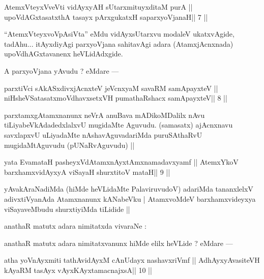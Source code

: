 \begin{shl}
AtemxVteyxVveVti vidAyxyAH sUtarxmituyxditaM purA ||
upoVdAGxtasatxthA tasayx pArxgukatxH saparxyoVjanaH\hfill || 7 ||
\end{shl}

\begin{artha}
``AtemxVteyxvoVpAsiVta'' eMdu vidAyxsUtarxvu modaleV ukatxvAgide, tadAhu... itAyxdiyAgi parxyoVjana sahitavAgi adara (AtamxjAcnxnada) upoVdhAGxtavanenx heVLidAdxgide.
\end{artha} 
 
\begin{artha}
A parxyoVjana yAvudu ? eMdare ---
\end{artha}

\begin{shl}
parxtiVci sAkASxdivxjAcnxteV jeVcnxyaM savaRM samApayxteV ||
niHsheVSatasatxmoVdhavxsetxVH pumathaRshacx samApayxteV\hfill || 8 ||
\end{shl}

\begin{artha}
parxtamxgAtamxnanunx neVrA anuBava mADikoMDalilx nAvu tiLiyabeVkAdadedxlalxvU mugidaMte Aguvudu. (samasatx) ajAcnxnavu savxlapxvU uLiyadaMte nAshavAguvadariMda puruSAthaRvU mugidaMtAguvudu (pUNaRvAguvudu) ||
\end{artha}

\begin{shl}
yata EvamataH pasheyxVdAtamxnAyxtAmxnamadavxyamf ||
AtemxYkoV barxhamxvidAyxyA viSayaH shurxtitoV mataH\hfill || 9 ||
\end{shl}

\begin{artha}
yAvakAraNadiMda (hiMde heVLidaMte PalaviruvudoV) adariMda tananxlelxV adivxtiVyanAda Atamxnanunx kANabeVku | AtamxvoMdeV barxhamxvideyxya viSayaveMbudu shurxtiyiMda tiLidide || 
\end{artha} 
 
\begin{artha}

anathaR matutx adara nimitatxda vivaraNe :
\end{artha} 
 
\begin{artha}
anathaR matutx adara nimitatxvanunx hiMde elilx heVLide ? eMdare --- 
\end{artha}

\begin{shl}
atha yoV\s nAyxmiti tathA\s vidAyxM cAnUdayx nashavxriVmf ||
A\s dhAyxyAvasiteVH kAyaRM tasAyx vAyxKAyxtamacnajxsA\hfill || 10 ||
\end{shl}

